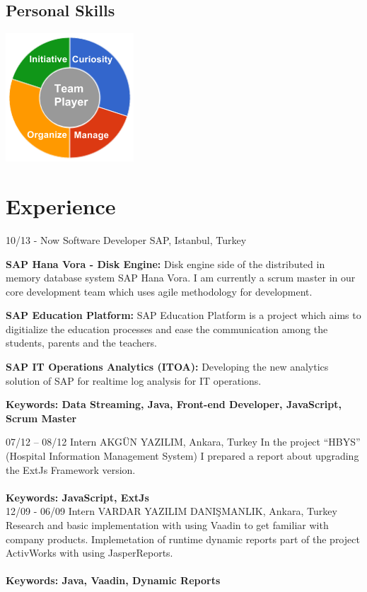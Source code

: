 \documentclass[]{friggeri-cv}
\begin{document}
\begin{aside}
  \section{Personal Skills}
    \includegraphics[scale=0.62]{img/personal.png}
    ~
\end{aside}

\section{Experience}
\begin{entrylist}
  \entry
    {10/13 - Now}
    {Software Developer}
    {SAP, Istanbul, Turkey}
    {
     \textbf{SAP Hana Vora - Disk Engine:} Disk engine side of the distributed in memory database system SAP Hana Vora. I am currently a scrum master in our core development team which uses agile methodology for development.
    \item \textbf{SAP Education Platform:} SAP Education Platform is a project which aims to digitialize the education processes and ease the communication among the students, parents and the teachers.
    \item \textbf{SAP IT Operations Analytics (ITOA):} Developing the new analytics solution of SAP for realtime log analysis for IT operations.\\
    \item \textbf{Keywords: Data Streaming, Java, Front-end Developer, JavaScript, Scrum Master\\}
    }
  \entry
    {07/12 – 08/12 }
    {Intern}
    {AKGÜN YAZILIM, Ankara, Turkey}
    {In the project “HBYS” (Hospital Information Management System) I prepared a report about upgrading the ExtJs Framework version.\\\\
    \textbf{Keywords: JavaScript, ExtJs\\}}
    \entry
    {12/09 - 06/09}
    {Intern}
    {VARDAR YAZILIM DANIŞMANLIK, Ankara, Turkey}
    {Research and basic implementation with using Vaadin to get familiar with company products. Implemetation of runtime dynamic reports part of the project ActivWorks with using JasperReports.\\\\
    \textbf{Keywords: Java, Vaadin, Dynamic Reports\\}
    }
\end{entrylist}
\end{document}
